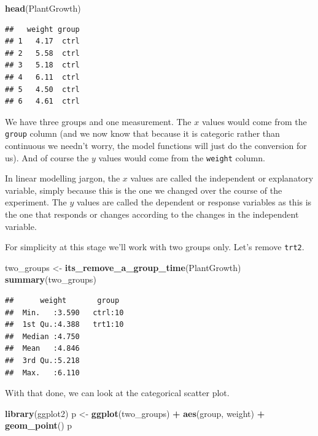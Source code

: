 \documentclass[
]{book}
\newenvironment{Shaded}{\begin{snugshade}}{\end{snugshade}}
\newcommand{\KeywordTok}[1]{\textcolor[rgb]{0.13,0.29,0.53}{\textbf{#1}}}
\newcommand{\NormalTok}[1]{#1}
\newcommand{\OperatorTok}[1]{\textcolor[rgb]{0.81,0.36,0.00}{\textbf{#1}}}
\newcommand{\StringTok}[1]{\textcolor[rgb]{0.31,0.60,0.02}{#1}}
\begin{document}
\begin{Shaded}
\begin{Highlighting}[]
\KeywordTok{head}\NormalTok{(PlantGrowth)}
\end{Highlighting}
\end{Shaded}

\begin{verbatim}
##   weight group
## 1   4.17  ctrl
## 2   5.58  ctrl
## 3   5.18  ctrl
## 4   6.11  ctrl
## 5   4.50  ctrl
## 6   4.61  ctrl
\end{verbatim}

We have three groups and one measurement. The \(x\) values would come from the \texttt{group} column (and we now know that because it is categoric rather than continuous we needn't worry, the model functions will just do the conversion for us). And of course the \(y\) values would come from the \texttt{weight} column.

In linear modelling jargon, the \(x\) values are called the independent or explanatory variable, simply because this is the one we changed over the course of the experiment. The \(y\) values are called the dependent or response variables as this is the one that responds or changes according to the changes in the independent variable.

For simplicity at this stage we'll work with two groups only. Let's remove \texttt{trt2}.

\begin{Shaded}
\begin{Highlighting}[]
\NormalTok{two_groups <-}\StringTok{ }\KeywordTok{its_remove_a_group_time}\NormalTok{(PlantGrowth)}
\KeywordTok{summary}\NormalTok{(two_groups)}
\end{Highlighting}
\end{Shaded}

\begin{verbatim}
##      weight       group   
##  Min.   :3.590   ctrl:10  
##  1st Qu.:4.388   trt1:10  
##  Median :4.750            
##  Mean   :4.846            
##  3rd Qu.:5.218            
##  Max.   :6.110
\end{verbatim}

With that done, we can look at the categorical scatter plot.

\begin{Shaded}
\begin{Highlighting}[]
\KeywordTok{library}\NormalTok{(ggplot2)}
\NormalTok{p <-}\StringTok{ }\KeywordTok{ggplot}\NormalTok{(two_groups) }\OperatorTok{+}\StringTok{ }\KeywordTok{aes}\NormalTok{(group, weight) }\OperatorTok{+}\StringTok{ }\KeywordTok{geom_point}\NormalTok{()}
\NormalTok{p}
\end{Highlighting}
\end{Shaded}
\end{document}
